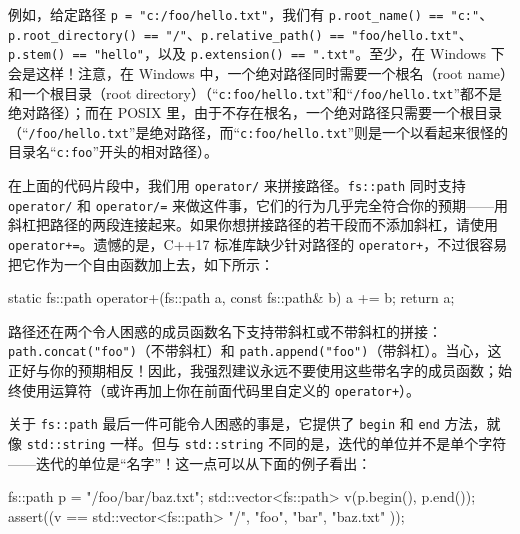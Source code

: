 例如，给定路径 \texttt{p = "c:/\allowbreak{}foo/\allowbreak{}hello.\allowbreak{}txt"}，我们有 \texttt{p.\allowbreak{}root\_\allowbreak{}name(\allowbreak{})\allowbreak{} == "c:"}、\texttt{p.\allowbreak{}root\_\allowbreak{}directory(\allowbreak{})\allowbreak{} == "/\allowbreak{}"}、\texttt{p.\allowbreak{}relative\_\allowbreak{}path(\allowbreak{})\allowbreak{} == "foo/\allowbreak{}hello.\allowbreak{}txt"}、\texttt{p.\allowbreak{}stem(\allowbreak{})\allowbreak{} == "hello"}，以及 \texttt{p.\allowbreak{}extension(\allowbreak{})\allowbreak{} == ".txt"}。至少，在 Windows 下会是这样！注意，在 Windows 中，一个绝对路径同时需要一个根名（root name）和一个根目录（root directory）（“\texttt{c:foo/\allowbreak{}hello.\allowbreak{}txt}”和“\texttt{/\allowbreak{}foo/\allowbreak{}hello.\allowbreak{}txt}”都不是绝对路径）；而在 POSIX 里，由于不存在根名，一个绝对路径只需要一个根目录（“\texttt{/\allowbreak{}foo/\allowbreak{}hello.\allowbreak{}txt}”是绝对路径，而“\texttt{c:foo/\allowbreak{}hello.\allowbreak{}txt}”则是一个以看起来很怪的目录名“\texttt{c:foo}”开头的相对路径）。

在上面的代码片段中，我们用 \texttt{operator/\allowbreak{}} 来拼接路径。\texttt{fs::\allowbreak{}path} 同时支持 \texttt{operator/\allowbreak{}} 和 \texttt{operator/\allowbreak{}=} 来做这件事，它们的行为几乎完全符合你的预期——用斜杠把路径的两段连接起来。如果你想拼接路径的若干段而不添加斜杠，请使用 \texttt{operator+=}。遗憾的是，C++17 标准库缺少针对路径的 \texttt{operator+}，不过很容易把它作为一个自由函数加上去，如下所示：

\begin{codebox}[cpp]
    static fs::path operator+(fs::path a, const fs::path& b)
    {
      a += b;
      return a;
    }
\end{codebox}

路径还在两个令人困惑的成员函数名下支持带斜杠或不带斜杠的拼接：\texttt{path.\allowbreak{}concat(\allowbreak{}"foo")\allowbreak{}}（不带斜杠）和 \texttt{path.\allowbreak{}append(\allowbreak{}"foo")\allowbreak{}}（带斜杠）。当心，这正好与你的预期相反！因此，我强烈建议永远不要使用这些带名字的成员函数；始终使用运算符（或许再加上你在前面代码里自定义的 \texttt{operator+}）。

关于 \texttt{fs::\allowbreak{}path} 最后一件可能令人困惑的事是，它提供了 \texttt{begin} 和 \texttt{end} 方法，就像 \texttt{std::\allowbreak{}string} 一样。但与 \texttt{std::\allowbreak{}string} 不同的是，迭代的单位并不是单个字符——迭代的单位是“名字”！这一点可以从下面的例子看出：

\begin{codebox}[cpp]
    fs::path p = "/foo/bar/baz.txt";
    std::vector<fs::path> v(p.begin(), p.end());
    assert((v == std::vector<fs::path>{
      "/", "foo", "bar", "baz.txt"
    }));
\end{codebox}

